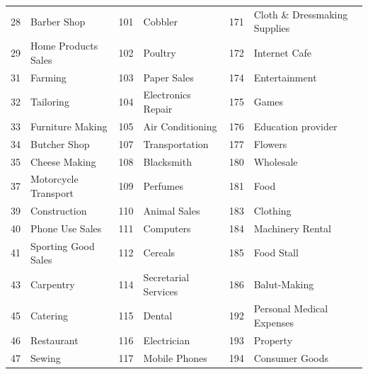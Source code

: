 \begin{longtable}[]{|r|l|r|l|r|l|}
	28          & Barber Shop           & 101         & Cobbler                   & 171         & Cloth \& Dressmaking
	Supplies                                                                                                                 \\
	29          & Home Products Sales   & 102         & Poultry                   & 172         & Internet Cafe              \\
	31          & Farming               & 103         & Paper Sales               & 174         & Entertainment              \\
	32          & Tailoring             & 104         & Electronics Repair        & 175         & Games                      \\
	33          & Furniture Making      & 105         & Air Conditioning          & 176         & Education
	provider                                                                                                                 \\
	34          & Butcher Shop          & 107         & Transportation            & 177         & Flowers                    \\
	35          & Cheese Making         & 108         & Blacksmith                & 180         & Wholesale                  \\
	37          & Motorcycle Transport  & 109         & Perfumes                  & 181         & Food                       \\
	39          & Construction          & 110         & Animal Sales              & 183         & Clothing                   \\
	40          & Phone Use Sales       & 111         & Computers                 & 184         & Machinery Rental           \\
	41          & Sporting Good Sales   & 112         & Cereals                   & 185         & Food Stall                 \\
	43          & Carpentry             & 114         & Secretarial Services      & 186         & Balut-Making               \\
	45          & Catering              & 115         & Dental                    & 192         & Personal Medical Expenses  \\
	46          & Restaurant            & 116         & Electrician               & 193         & Property                   \\
	47          & Sewing                & 117         & Mobile Phones             & 194         & Consumer Goods             \\

\end{longtable}
